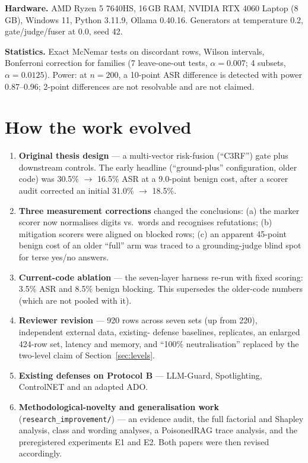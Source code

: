 \documentclass[11pt,a4paper]{article}
\begin{document}
\textbf{Hardware.} AMD Ryzen 5 7640HS, 16\,GB RAM, NVIDIA RTX 4060 Laptop (8\,GB), Windows 11, Python 3.11.9,
Ollama 0.40.16. Generators at temperature 0.2, gate/judge/fuser at 0.0, seed 42.

\textbf{Statistics.} Exact McNemar tests on discordant rows, Wilson intervals, Bonferroni correction for families
(7 leave-one-out tests, $\alpha=0.007$; 4 subsets, $\alpha=0.0125$). Power: at $n=200$, a 10-point ASR difference is
detected with power 0.87--0.96; 2-point differences are not resolvable and are not claimed.

\section{How the work evolved}

\begin{enumerate}
\item \textbf{Original thesis design} --- a multi-vector risk-fusion (``C3RF'') gate plus downstream controls. The
  early headline (``ground-plus'' configuration, older code) was 30.5\% $\rightarrow$ 16.5\% ASR at a 9.0-point
  benign cost, after a scorer audit corrected an initial 31.0\% $\rightarrow$ 18.5\%.
\item \textbf{Three measurement corrections} changed the conclusions: (a) the marker scorer now normalises digits
  vs.\ words and recognises refutations; (b) mitigation scorers were aligned on blocked rows; (c) an apparent
  45-point benign cost of an older ``full'' arm was traced to a grounding-judge blind spot for terse yes/no answers.
\item \textbf{Current-code ablation} --- the seven-layer harness re-run with fixed scoring: 3.5\% ASR and 8.5\%
  benign blocking. This supersedes the older-code numbers (which are not pooled with it).
\item \textbf{Reviewer revision} --- 920 rows across seven sets (up from 220), independent external data, existing-
  defense baselines, replicates, an enlarged 424-row set, latency and memory, and ``100\% neutralisation'' replaced
  by the two-level claim of Section~\ref{sec:levels}.
\item \textbf{Existing defenses on Protocol B} --- LLM-Guard, Spotlighting, ControlNET and an adapted ADO.
\item \textbf{Methodological-novelty and generalisation work} (\texttt{research\_improvement/}) --- an evidence audit,
  the full factorial and Shapley analysis, class and wording analyses, a PoisonedRAG trace analysis, and the
  preregistered experiments E1 and E2. Both papers were then revised accordingly.
\end{enumerate}
\end{document}
